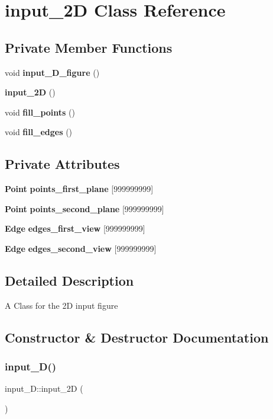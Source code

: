 \section{input\+\_\+2D Class Reference}
\label{classinput__2_d}
\subsection*{Private Member Functions}
\begin{DoxyCompactItemize}
\item 
void \textbf{ input\+\_\+D\+\_\+figure} ()
\item 
\textbf{ input\+\_\+2D} ()
\item 
void \textbf{ fill\+\_\+points} ()
\item 
void \textbf{ fill\+\_\+edges} ()
\end{DoxyCompactItemize}
\subsection*{Private Attributes}
\begin{DoxyCompactItemize}
\item 
\textbf{ Point} \textbf{ points\+\_\+first\+\_\+plane} [999999999]
\item 
\textbf{ Point} \textbf{ points\+\_\+second\+\_\+plane} [999999999]
\item 
\textbf{ Edge} \textbf{ edges\+\_\+first\+\_\+view} [999999999]
\item 
\textbf{ Edge} \textbf{ edges\+\_\+second\+\_\+view} [999999999]
\end{DoxyCompactItemize}


\subsection{Detailed Description}
A Class for the 2D input figure 

\subsection{Constructor \& Destructor Documentation}
\mbox{\label{classinput__2_d_a7817af6b6c686cefa00cfbdf99c78064}} 
\subsubsection{input\+\_\+D()}
{\footnotesize\ttfamily input\+\_\+D\+::input\+\_\+2D (\begin{DoxyParamCaption}{ }\end{DoxyParamCaption})\hspace{0.3cm}{\ttfamily [private]}}

